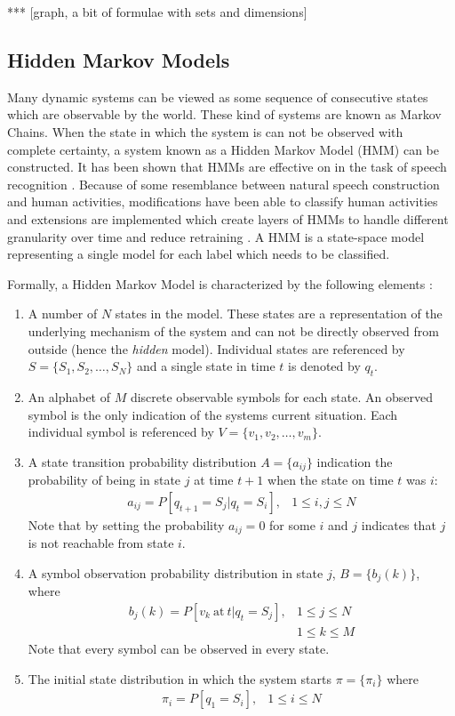 *** [graph, a bit of formulae with sets and dimensions]




\subsection{Hidden Markov Models}
Many dynamic systems can be viewed as some sequence of consecutive states which are observable by the world.
These kind of systems are known as Markov Chains.
When the state in which the system is can not be observed with complete certainty, a system known as a Hidden Markov Model (HMM) can be constructed.
It has been shown that HMMs are effective on in the task of speech recognition \cite{rabiner1989tutorial}.
Because of some resemblance between natural speech construction and human activities, modifications have been able to classify human activities \cite{guenterberg2009distributed} and extensions are implemented which create layers of HMMs to handle different granularity over time and reduce retraining \cite{oliver2002layered,perdikis2008recognition}.
A HMM is a state-space model representing a single model for each label which needs to be classified.

Formally, a Hidden Markov Model is characterized by the following elements
\cite{rabiner1989tutorial}:
\begin{enumerate}
	\item
		A number of $N$ states in the model.
		These states are a representation of the underlying mechanism of the system and can not be directly observed from outside (hence the \emph{hidden} model).
		Individual states are referenced by $S = \{S_1, S_2, \dots, S_N \}$ and a single state in time $t$ is denoted by $q_t$.
	\item
		An alphabet of $M$ discrete observable symbols for each state.
		An observed symbol is the only indication of the systems current situation.
		Each individual symbol is referenced by $V = \{ v_1, v_2, \dots, v_m \}$.
	\item
		A state transition probability distribution $A = \{ a_{ij} \}$ indication the probability of being in state $j$ at time $t+1$ when the state on time $t$ was $i$:
		\begin{eqnarray}
			a_{ij} = P [ q_{t+1} = S_j | q_t = S_i ], & 1 \le i, j \le N
		\end{eqnarray}
		Note that by setting the probability $a_{ij}=0$ for some $i$ and $j$ indicates that $j$ is not reachable from state $i$.
	\item
		A symbol observation probability distribution in state $j$, $B = \{b_j(k) \}$, where
		\begin{eqnarray}
			b_j(k) = P[ v_k\ \mathrm{at} \ t | q_t = S_j], & 1 \le j \le N \nonumber \\
			& 1 \le k \le M
		\end{eqnarray}
		Note that every symbol can be observed in every state.
	\item
	The initial state distribution in which the system starts $\pi= \{ \pi_i \}$ where
	\begin{eqnarray}
		\pi_i = P[q_1 = S_i], & 1 \le i \le N
	\end{eqnarray}
\end{enumerate}

